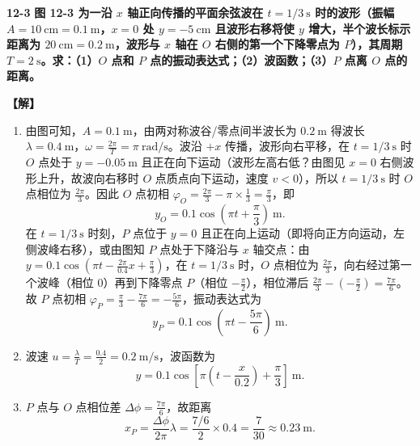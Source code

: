 \documentclass[zihao=5,a4paper,UTF8]{ctexart}
\newenvironment{prob}[2]{%
    \par\vspace{6pt}\noindent\textbf{\color{navy}#1} \textbf{#2}\par\nopagebreak\vspace{2pt}%
}{%
    \par\vspace{4pt}%
}
\newcommand{\sol}{\noindent\textbf{\color{tealaccent}【解】}\ }
\begin{document}
\begin{prob}{12-3}{图 12-3 为一沿 $x$ 轴正向传播的平面余弦波在 $t = 1/3\ \mathrm{s}$ 时的波形（振幅 $A=10\ \mathrm{cm}=0.1\ \mathrm{m}$，$x=0$ 处 $y=-5\ \mathrm{cm}$ 且波形右移将使 $y$ 增大，半个波长标示距离为 $20\ \mathrm{cm}=0.2\ \mathrm{m}$，波形与 $x$ 轴在 $O$ 右侧的第一个下降零点为 $P$），其周期 $T=2\ \mathrm{s}$。求：（1）$O$ 点和 $P$ 点的振动表达式；（2）波函数；（3）$P$ 点离 $O$ 点的距离。}
\sol
\begin{enumerate}[leftmargin=2em, itemsep=2pt]
    \item 由图可知，$A = 0.1\ \mathrm{m}$，由两对称波谷/零点间半波长为 $0.2\ \mathrm{m}$ 得波长 $\lambda = 0.4\ \mathrm{m}$，$\omega = \frac{2\pi}{T} = \pi\ \mathrm{rad/s}$。波沿 $+x$ 传播，波形向右平移，在 $t=1/3\ \mathrm{s}$ 时 $O$ 点处于 $y = -0.05\ \mathrm{m}$ 且正在向下运动（波形左高右低？由图见 $x=0$ 右侧波形上升，故波向右移时 $O$ 点质点向下运动，速度 $v<0$），所以 $t=1/3\ \mathrm{s}$ 时 $O$ 点相位为 $\frac{2\pi}{3}$。因此 $O$ 点初相 $\varphi_O = \frac{2\pi}{3} - \pi\times\frac{1}{3} = \frac{\pi}{3}$，即
    \[
        y_O = 0.1\cos\left(\pi t + \frac{\pi}{3}\right)\ \mathrm{m}.
    \]
    在 $t=1/3\ \mathrm{s}$ 时刻，$P$ 点位于 $y=0$ 且正在向上运动（即将向正方向运动，左侧波峰右移），或由图知 $P$ 点处于下降沿与 $x$ 轴交点：由 $y = 0.1\cos(\pi t - \frac{2\pi}{0.4}x + \frac{\pi}{3})$，在 $t=1/3\ \mathrm{s}$ 时，$O$ 点相位为 $\frac{2\pi}{3}$，向右经过第一个波峰（相位 $0$）再到下降零点 $P$（相位 $-\frac{\pi}{2}$），相位滞后 $\frac{2\pi}{3} - (-\frac{\pi}{2}) = \frac{7\pi}{6}$。故 $P$ 点初相 $\varphi_P = \frac{\pi}{3} - \frac{7\pi}{6} = -\frac{5\pi}{6}$，振动表达式为
    \[
        y_P = 0.1\cos\left(\pi t - \frac{5\pi}{6}\right)\ \mathrm{m}.
    \]
    \item 波速 $u = \frac{\lambda}{T} = \frac{0.4}{2} = 0.2\ \mathrm{m/s}$，波函数为
    \[
        y = 0.1\cos\left[\pi\left(t - \frac{x}{0.2}\right) + \frac{\pi}{3}\right]\ \mathrm{m}.
    \]
    \item $P$ 点与 $O$ 点相位差 $\Delta\phi = \frac{7\pi}{6}$，故距离
    \[
        x_P = \frac{\Delta\phi}{2\pi}\lambda = \frac{7/6}{2}\times 0.4 = \frac{7}{30} \approx 0.23\ \mathrm{m}.
    \]
\end{enumerate}
\end{prob}
\end{document}
